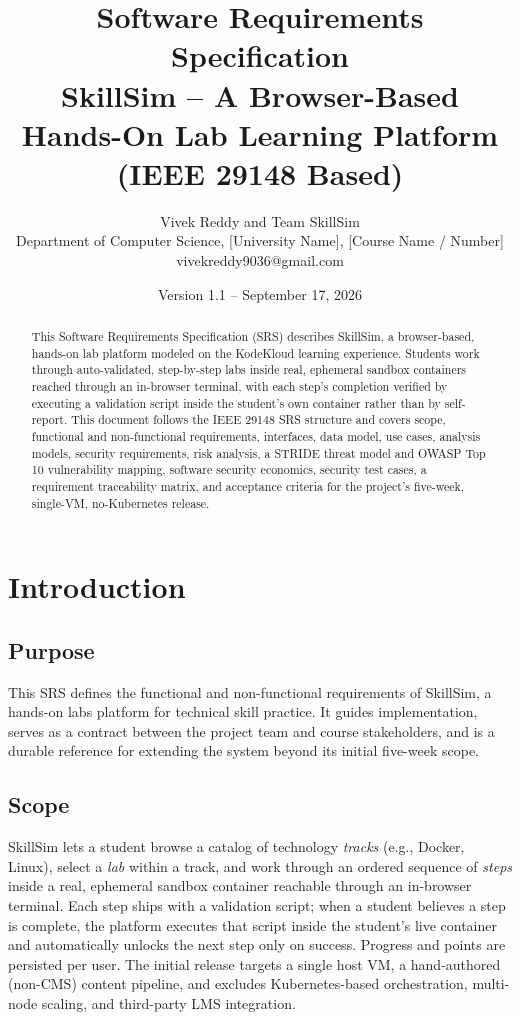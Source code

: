 \documentclass[11pt]{article}
\title{\vspace{-1.5cm}Software Requirements Specification\\[2pt]
\Large SkillSim -- A Browser-Based Hands-On Lab Learning Platform\\[4pt]
\normalsize (IEEE 29148 Based)}
\author{Vivek Reddy and Team SkillSim \\
\small Department of Computer Science, [University Name], [Course Name / Number] \\
\small vivekreddy9036@gmail.com}
\date{Version 1.1 \quad -- \quad September 17, 2026}
\begin{document}
\maketitle
\thispagestyle{empty}

\begin{abstract}
\noindent This Software Requirements Specification (SRS) describes
SkillSim, a browser-based, hands-on lab platform modeled on the
KodeKloud learning experience. Students work through auto-validated,
step-by-step labs inside real, ephemeral sandbox containers reached
through an in-browser terminal, with each step's completion verified
by executing a validation script inside the student's own container
rather than by self-report. This document follows the IEEE 29148 SRS
structure and covers scope, functional and non-functional
requirements, interfaces, data model, use cases, analysis models,
security requirements, risk analysis, a STRIDE threat model and
OWASP Top 10 vulnerability mapping, software security economics,
security test cases, a requirement traceability matrix, and
acceptance criteria for the project's five-week, single-VM,
no-Kubernetes release.
\end{abstract}

\newpage
\tableofcontents
\newpage

\section{Introduction}

\subsection{Purpose}
This SRS defines the functional and non-functional requirements of
SkillSim, a hands-on labs platform for technical skill practice. It
guides implementation, serves as a contract between the project team
and course stakeholders, and is a durable reference for extending the
system beyond its initial five-week scope.

\subsection{Scope}
SkillSim lets a student browse a catalog of technology \emph{tracks}
(e.g., Docker, Linux), select a \emph{lab} within a track, and work
through an ordered sequence of \emph{steps} inside a real, ephemeral
sandbox container reachable through an in-browser terminal. Each step
ships with a validation script; when a student believes a step is
complete, the platform executes that script inside the student's live
container and automatically unlocks the next step only on success.
Progress and points are persisted per user. The initial release
targets a single host VM, a hand-authored (non-CMS) content pipeline,
and excludes Kubernetes-based orchestration, multi-node scaling, and
third-party LMS integration.
\end{document}

